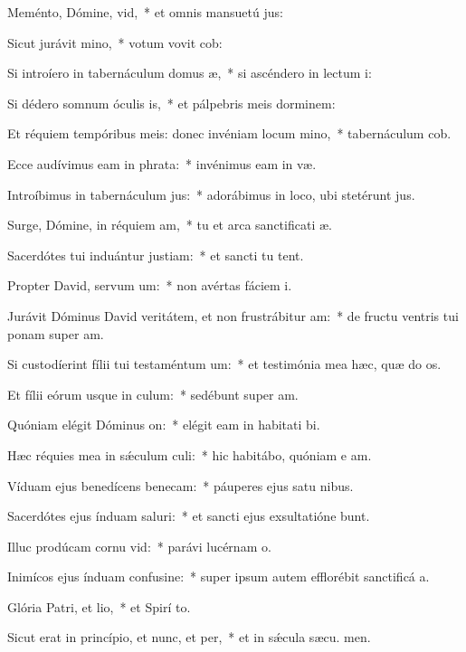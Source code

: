 \item Meménto, Dómine, vid,~* et omnis mansuetú jus:
\item Sicut jurávit mino,~* votum vovit  cob:
\item Si introíero in tabernáculum domus æ,~* si ascéndero in lectum  i:
\item Si dédero somnum óculis is,~* et pálpebris meis dorminem:
\item Et réquiem tempóribus meis: donec invéniam locum mino,~* tabernáculum  cob.
\item Ecce audívimus eam in phrata:~* invénimus eam in  væ.
\item Introíbimus in tabernáculum jus:~* adorábimus in loco, ubi stetérunt  jus.
\item Surge, Dómine, in réquiem am,~* tu et arca sanctificati æ.
\item Sacerdótes tui induántur justiam:~* et sancti tu tent.
\item Propter David, servum um:~* non avértas fáciem  i.
\item Jurávit Dóminus David veritátem, et non frustrábitur am:~* de fructu ventris tui ponam super  am.
\item Si custodíerint fílii tui testaméntum um:~* et testimónia mea hæc, quæ do os.
\item Et fílii eórum usque in culum:~* sedébunt super  am.
\item Quóniam elégit Dóminus on:~* elégit eam in habitati bi.
\item Hæc réquies mea in sǽculum culi:~* hic habitábo, quóniam e am.
\item Víduam ejus benedícens benecam:~* páuperes ejus satu nibus.
\item Sacerdótes ejus índuam saluri:~* et sancti ejus exsultatióne bunt.
\item Illuc prodúcam cornu vid:~* parávi lucérnam  o.
\item Inimícos ejus índuam confusine:~* super ipsum autem efflorébit sanctificá a.
\item Glória Patri, et lio,~* et Spirí to.
\item Sicut erat in princípio, et nunc, et per,~* et in sǽcula sæcu. men.
